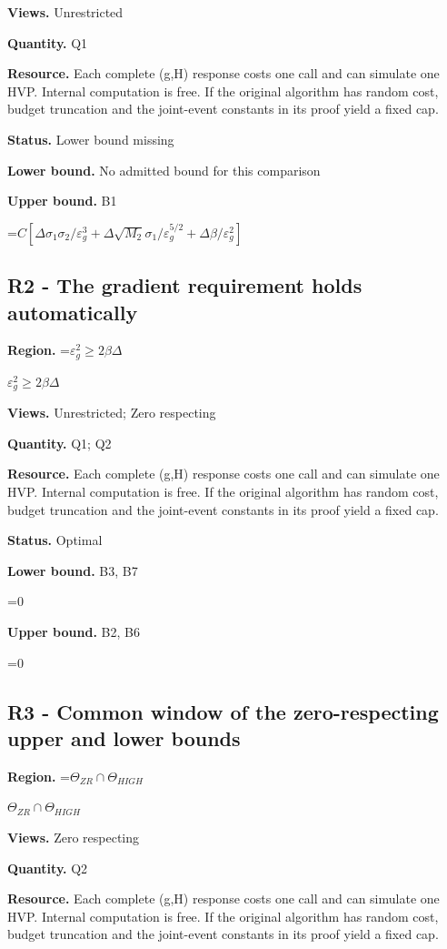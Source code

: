 \documentclass[10pt,a4paper]{article}
\newcommand{\AtlasMath}[1]{\par\begingroup\centering\setbox0=\hbox{$\displaystyle #1$}\ifdim\wd0>1.4\linewidth\typeout{ATLAS WIDE FORMULA: \the\wd0}\fi\ifdim\wd0>\linewidth\resizebox{\linewidth}{!}{\box0}\else\box0\fi\par\endgroup}
\newcommand{\AtlasInlineMath}[1]{\begingroup\setbox0=\hbox{$#1$}\ifdim\wd0>.4\linewidth\endgroup\AtlasMath{#1}\else\endgroup$#1$\fi}
\begin{document}
\textbf{Views.} Unrestricted

\textbf{Quantity.} Q1

\textbf{Resource.} Each complete (g,H) response costs one call and can simulate one HVP. Internal computation is free. If the original algorithm has random cost, budget truncation and the joint-event constants in its proof yield a fixed cap.

\textbf{Status.} Lower bound missing

\textbf{Lower bound.} No admitted bound for this comparison

\textbf{Upper bound.} B1

\AtlasMath{C[\Delta\sigma_1\sigma_2/\varepsilon_g^3+\Delta\sqrt{M_2}\sigma_1/\varepsilon_g^{5/2}+\Delta\beta/\varepsilon_g^2]}
\subsection{R2 - The gradient requirement holds automatically}
\textbf{Region.} \AtlasInlineMath{\varepsilon_g^2\ge2\beta\Delta}

\textbf{Views.} Unrestricted; Zero respecting

\textbf{Quantity.} Q1; Q2

\textbf{Resource.} Each complete (g,H) response costs one call and can simulate one HVP. Internal computation is free. If the original algorithm has random cost, budget truncation and the joint-event constants in its proof yield a fixed cap.

\textbf{Status.} Optimal

\textbf{Lower bound.} B3, B7

\AtlasMath{0}
\textbf{Upper bound.} B2, B6

\AtlasMath{0}
\subsection{R3 - Common window of the zero-respecting upper and lower bounds}
\textbf{Region.} \AtlasInlineMath{\Theta_{ZR}\cap\Theta_{HIGH}}

\textbf{Views.} Zero respecting

\textbf{Quantity.} Q2

\textbf{Resource.} Each complete (g,H) response costs one call and can simulate one HVP. Internal computation is free. If the original algorithm has random cost, budget truncation and the joint-event constants in its proof yield a fixed cap.
\end{document}
